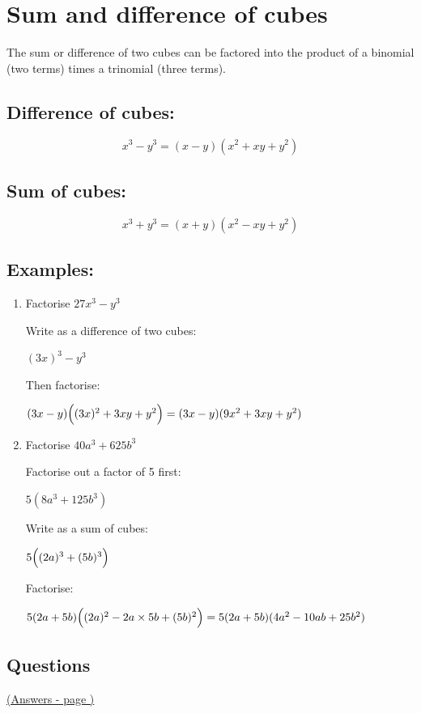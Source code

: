\documentclass[../main.tex]{subfiles}
\begin{document}
\section{Sum and difference of cubes}
The sum or difference of two cubes can be factored into the product of a binomial (two terms) times a trinomial (three terms).

\subsection*{Difference of cubes:}
\[x^3-y^3=(x-y)(x^2+xy+y^2)\]

\subsection*{Sum of cubes:}
\[x^3+y^3=(x+y)(x^2-xy+y^2)\]

\subsection*{Examples:}
\begin{enumerate}[itemsep=1cm]
    \item 
    Factorise $27x^3-y^3$

    Write as a difference of two cubes:

    $(3x)^3-y^3$

    Then factorise:

    $(3x-y)\Bigl((3x)^2+3xy+y^2\Bigr)=(3x-y)(9x^2+3xy+y^2)$

    \item 
    Factorise $40a^3+625b^3$

    Factorise out a factor of 5 first:

    $5(8a^3+125b^3)$

    Write as a sum of cubes:

    $5\Bigl((2a)^3+(5b)^3\Bigr)$

    Factorise:

    $5(2a+5b)\Bigl((2a)^2-2a\times5b+(5b)^2\Bigr)=5(2a+5b)(4a^2-10ab+25b^2)$
\end{enumerate}

\pagebreak
\hypertarget{sumdifferenceofcubeslink}{\subsection*{Questions}}
\hyperlink{sumdifferenceofcubesanswers}{(Answers - page {\pageref*{Sum or difference of cubes answers}})}
\end{document}
